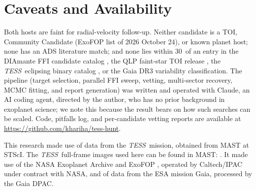 \documentclass[RNAAS]{aastex631}
\newcommand{\tess}{\textit{TESS}}
\begin{document}
\section{Caveats and Availability}
Both hosts are faint for radial-velocity follow-up. Neither candidate is a TOI, Community Candidate (ExoFOP list of 2026 October 24), or known planet host; none has an ADS literature match; and none lies within 30\arcsec\ of an entry in the DIAmante FFI candidate catalog \citep{montalto2020}, the QLP faint-star TOI release \citep{kunimoto2022}, the \tess\ eclipsing binary catalog \citep{prsa2022}, or the Gaia DR3 variability classification. The pipeline (target selection, parallel FFI sweep, vetting, multi-sector recovery, MCMC fitting, and report generation) was written and operated with Claude, an AI coding agent, directed by the author, who has no prior background in exoplanet science; we note this because the result bears on how such searches can be scaled. Code, pitfalls log, and per-candidate vetting reports are available at \url{https://github.com/khariha/tess-hunt}.

\begin{acknowledgments}
This research made use of data from the \tess\ mission, obtained from MAST at STScI. The \tess\ full-frame images used here can be found in MAST: . It made use of the NASA Exoplanet Archive  and ExoFOP , operated by Caltech/IPAC under contract with NASA, and of data from the ESA mission Gaia, processed by the Gaia DPAC.
\end{acknowledgments}

\end{document}

